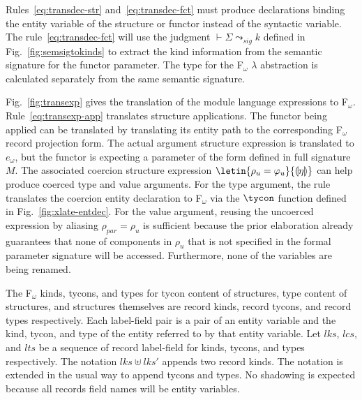 \documentclass[9pt,nocopyrightspace, fleqn]{sigplanconf}
\begin{document}

Rules~\ref{eq:transdec-str}
and~\ref{eq:transdec-fct} must produce declarations binding the entity
variable of the structure or functor instead of the syntactic
variable. %
The rule~\ref{eq:transdec-fct} will use the judgment $\vdash \Sigma
\leadsto_{sig} k$ defined in Fig.~\ref{fig:semsigtokinds} to extract
the kind information from the semantic signature for the functor
parameter. The type for the F$_\omega$ $\lambda$ abstraction is
calculated separately from the same semantic signature. 

Fig.~\ref{fig:transexp} gives the translation of the module
language expressions to F$_\omega$. Rule~\ref{eq:transexp-app} translates
structure applications. The functor being applied can be translated by
translating its entity path to the corresponding F$_\omega$ record
projection form. The actual argument structure expression is
translated to $e_\omega$, but the functor is expecting a parameter of
the form defined in full signature $M$. The associated coercion
structure expression $\letin{\rho_u=\varphi_u}{\llparenthesis \eta
  \rrparenthesis}$ can help produce coerced type and value
arguments. For the type argument, the rule translates the coercion entity
declaration to F$_\omega$ via the $\tycon$ function defined in
Fig.~\ref{fig:xlate-entdec}. For the value argument, reusing the
uncoerced expression by aliasing $\rho_{par} = \rho_u$ is sufficient
because the prior elaboration already guarantees that none of
components in $\rho_u$ that is not specified in the formal parameter
signature will be accessed. Furthermore, none of the variables are
being renamed. 

The F$_\omega$ kinds, tycons, and types for tycon content of
structures, type content of structures, and structures themselves are
record kinds, record tycons, and record types respectively. Each
label-field pair is a pair of an entity variable and the kind, tycon,
and type of the entity referred to by that entity variable. Let $lks$,
$lcs$, and $lts$ be a sequence of record label-field for kinds,
tycons, and types respectively. The notation $lks\uplus lks'$ appends
two record kinds. The notation is extended in the usual way to append
tycons and types. No shadowing is expected because all records field
names will be entity variables.
\end{document}
